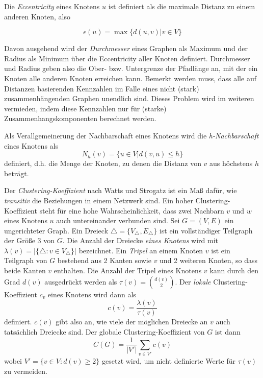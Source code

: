 Die \emph{Eccentricity} eines Knotens $u$ ist definiert als die
maximale Distanz zu einem anderen Knoten, also

\begin{equation}
  \label{eq:3}
  \epsilon(u) = \max\{d(u,v) | v \in V\}
\end{equation}

Davon ausgehend  wird der \emph{Durchmesser} eines Graphen als Maximum
und der Radius als Minimum über die Eccentricity aller Knoten
definiert. Durchmesser und Radius geben also die Ober-
bzw. Untergrenze der Pfadlänge an, mit der ein Knoten alle anderen
Knoten erreichen kann. Bemerkt werden muss, dass alle auf Distanzen
basierenden Kennzahlen im Falle eines nicht (stark)
zusammenhängenden Graphen unendlich sind. Dieses Problem wird im
weiteren vermieden, indem diese Kennzahlen nur für (starke)
Zusammenhangskomponenten berechnet werden.

Als Verallgemeinerung der Nachbarschaft eines Knotens wird die
\emph{h-Nachbarschaft} eines Knotens als
\begin{equation}
  \label{eq:4}
  N_h(v) = \{ u \in V | d(v, u) \le h \}
\end{equation}
definiert, d.h. die Menge der Knoten, zu denen die Distanz von $v$ aus
höchstens $h$ beträgt.

Der \emph{Clustering-Koeffizient} nach Watts und Strogatz ist ein
Ma{\ss}
dafür, wie \emph{transitiv} die Beziehungen in einem Netzwerk
sind. Ein hoher Clustering-Koeffizient steht für eine hohe
Wahrscheinlichkeit, dass zwei Nachbarn $v$ und $w$ eines Knotens $u$
auch untereinander verbunden sind. Sei $G = (V, E)$ ein ungerichteter
Graph. Ein Dreieck $\bigtriangleup = \{V_{\bigtriangleup},
E_{\bigtriangleup}\}$ ist ein vollständiger Teilgraph der Größe 3
von $G$. Die Anzahl der Dreiecke \emph{eines Knotens} wird mit
$\lambda(v) = |\{\bigtriangleup : v \in V_{\bigtriangleup}\}|$
bezeichnet. Ein \emph{Tripel} an einem Knoten $v$ ist ein Teilgraph
von $G$ bestehend aus 2 Kanten sowie $v$ und 2 weiteren Knoten, so
dass beide Kanten $v$ enthalten. Die Anzahl der Tripel eines Knotens
$v$ kann durch den Grad $d(v)$ ausgedrückt werden als
$\tau(v)=\binom{d(v)}{2}$. Der \emph{lokale} Clustering-Koeffizient
$c_v$ eines Knotens wird dann als
\begin{equation}
  \label{eq:5}
  c(v) = \frac{\lambda(v)}{\tau(v)}
\end{equation}
definiert. $c(v)$ gibt also an, wie viele der
möglichen Dreiecke an $v$ auch tatsächlich Dreiecke sind. Der
globale Clustering-Koeffizient von $G$ ist dann
\begin{equation}
  \label{eq:6}
  C(G) = \frac{1}{|V'|} \sum_{v \in V'}c(v)
\end{equation}
wobei $V' = \{v \in V : d(v) \ge 2\}$ gesetzt wird, um nicht
definierte Werte für $\tau(v)$ zu vermeiden.

